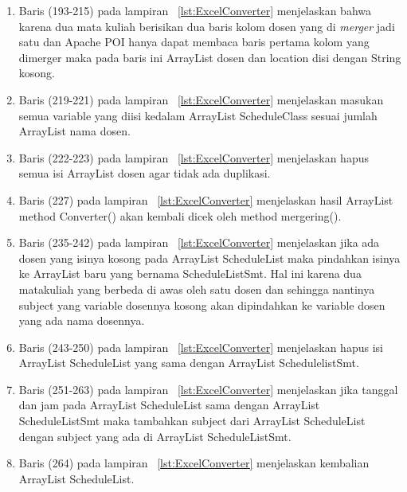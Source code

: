 \begin{enumerate}
\begin{enumerate}
		\item Baris (193-215) pada lampiran ~\ref{lst:ExcelConverter} menjelaskan bahwa karena dua mata kuliah berisikan dua baris kolom dosen yang di \textit{merger} jadi satu dan Apache POI hanya dapat membaca baris pertama kolom yang dimerger maka pada baris ini ArrayList dosen dan location disi dengan String kosong.
		\item Baris (219-221) pada lampiran ~\ref{lst:ExcelConverter} menjelaskan masukan semua variable yang diisi kedalam ArrayList ScheduleClass sesuai jumlah ArrayList nama dosen.
		\item Baris (222-223) pada lampiran ~\ref{lst:ExcelConverter} menjelaskan hapus semua isi ArrayList dosen agar tidak ada duplikasi.
		\item Baris (227) pada lampiran ~\ref{lst:ExcelConverter} menjelaskan hasil ArrayList method Converter() akan kembali dicek oleh method mergering().
		\item Baris (235-242) pada lampiran ~\ref{lst:ExcelConverter} menjelaskan jika ada dosen yang isinya kosong pada ArrayList ScheduleList maka pindahkan isinya ke ArrayList baru yang bernama ScheduleListSmt. Hal ini karena dua matakuliah yang berbeda di awas oleh satu dosen dan sehingga nantinya subject yang variable dosennya kosong akan dipindahkan ke variable dosen yang ada nama dosennya.
		\item Baris (243-250) pada lampiran ~\ref{lst:ExcelConverter} menjelaskan hapus isi ArrayList ScheduleList yang sama dengan ArrayList SchedulelistSmt.
		\item Baris (251-263) pada lampiran ~\ref{lst:ExcelConverter} menjelaskan jika tanggal dan jam pada ArrayList ScheduleList sama dengan ArrayList ScheduleListSmt maka tambahkan subject dari ArrayList ScheduleList dengan subject yang ada di ArrayList ScheduleListSmt.
		\item Baris (264) pada lampiran ~\ref{lst:ExcelConverter} menjelaskan kembalian ArrayList ScheduleList.				
	\end{enumerate}


\end{enumerate}
